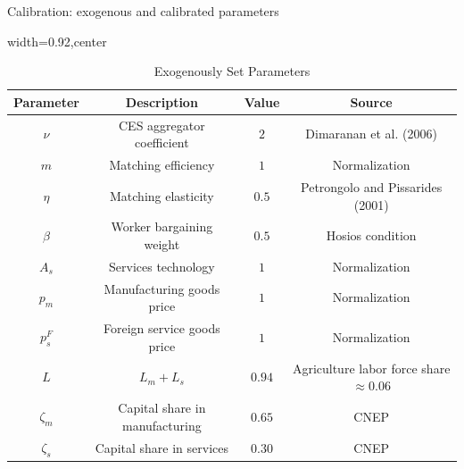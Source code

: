 \documentclass[9pt,xcolor={svgnames}]{beamer}
\begin{document}
\begin{frame}{Calibration: exogenous and calibrated parameters}

\begin{table}[h!]
\centering
\caption{Exogenously Set Parameters}
\label{table_set_parameters_slides}
\begin{adjustbox}{width=0.92\columnwidth,center}
\begin{tabular}{||c c c c||}\hline
\textbf{Parameter} & \textbf{Description} & \textbf{Value} & \textbf{Source} \\\hline\hline
$\nu$ & CES aggregator coefficient & $2$ & Dimaranan et al. (2006) \\
$m$ & Matching efficiency & $1$ & Normalization \\
$\eta$ & Matching elasticity & $0.5$ & Petrongolo and Pissarides (2001) \\
$\beta$ & Worker bargaining weight & $0.5$ & Hosios condition \\
$A_s$ & Services technology & $1$ & Normalization \\
$p_m$ & Manufacturing goods price & $1$ & Normalization \\
$p_s^F$ & Foreign service goods price & $1$ & Normalization \\
$L$ & $L_m + L_s$ & $0.94$ & Agriculture labor force share $\approx 0.06$ \\
$\zeta_m$ & Capital share in manufacturing & $0.65$ & CNEP \\
$\zeta_s$ & Capital share in services & $0.30$ & CNEP \\
\hline
\end{tabular}
\end{adjustbox}
\end{table}

\vspace{-0.2cm}


\end{frame}
\end{document}
